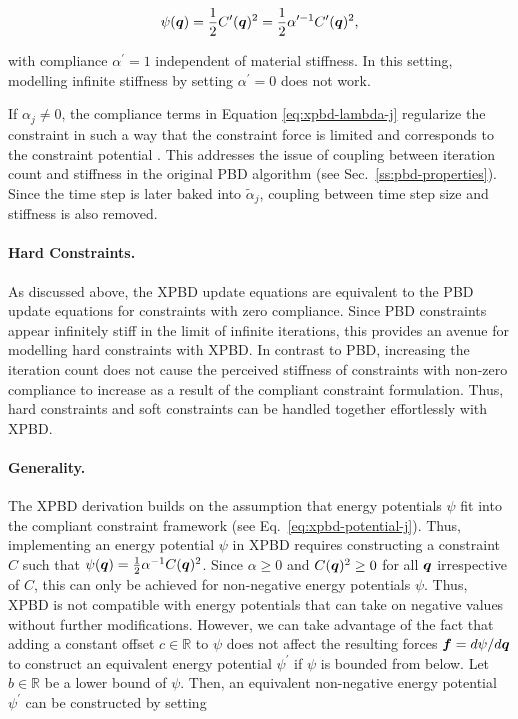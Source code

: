 \[
    \psi(\bm{q}) = \frac{1}{2} C^{\prime}(\bm{q})^2 = \frac{1}{2} \alpha^{\prime -1}C^{\prime}(\bm{q})^2,
\]

\noindent with compliance $\alpha^\prime = 1$ independent of material stiffness. In this setting, modelling infinite stiffness by setting 
$\alpha^\prime = 0$ does not work.

If $\alpha_j \neq 0$, the compliance terms in Equation \ref{eq:xpbd-lambda-j} regularize the constraint in such a way that the constraint force is 
limited and corresponds to the constraint potential \cite{macklin2016}. This addresses the issue of coupling between iteration count and stiffness in 
the original PBD algorithm (see Sec.\ \ref{ss:pbd-properties}). Since the time step is later baked into $\tilde{\alpha}_j$, coupling between time step size 
and stiffness is also removed.

\paragraph{Hard Constraints.}
As discussed above, the XPBD update equations are equivalent to the PBD update equations for constraints with zero compliance. Since PBD constraints appear 
infinitely stiff in the limit of infinite iterations, this provides an avenue for modelling hard constraints with XPBD. In contrast to PBD, increasing 
the iteration count does not cause the perceived stiffness of constraints with non-zero compliance to increase as a result of the compliant constraint 
formulation. Thus, hard constraints and soft constraints can be handled together effortlessly with XPBD.

\paragraph{Generality.}
The XPBD derivation builds on the assumption that energy potentials $\psi$ fit into the compliant constraint framework (see Eq.\ \ref{eq:xpbd-potential-j}).
Thus, implementing an energy potential $\psi$ in XPBD requires constructing a constraint $C$ such that 
$\psi(\bm{q}) = \frac{1}{2} \alpha^{-1} C(\bm{q})^2$. Since $\alpha \geq 0$ and $C(\bm{q})^2 \geq 0$ for all $\bm{q}$ irrespective of $C$, this 
can only be achieved for non-negative energy potentials 
$\psi$. Thus, XPBD is not compatible with energy potentials that can take on negative values without further modifications. However, we can take 
advantage of the fact that adding a constant offset $c \in \mathbb{R}$ to $\psi$ does not affect the resulting forces $\bm{f} = d\psi / d\bm{q}$ 
to construct an equivalent energy potential $\psi^\prime$ if $\psi$ is bounded from below. Let $b \in \mathbb{R}$ be a lower bound of $\psi$. Then,
an equivalent non-negative energy potential $\psi^\prime$ can be constructed by setting

